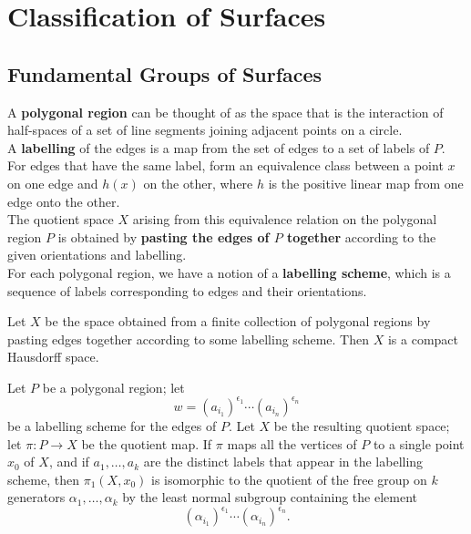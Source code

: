 \newpage

\section{Classification of Surfaces}

\setcounter{subsection}{73}
\subsection{Fundamental Groups of Surfaces}

\begin{definition}
A \textbf{polygonal region} can be thought of as the space that is the interaction of half-spaces of a set of line segments joining adjacent points on a circle. \\
    
A \textbf{labelling} of the edges is a map from the set of edges to a set of labels of $P$. For edges that have the same label, form an equivalence class between a point $x$ on one edge and $h(x)$ on the other, where $h$ is the positive linear map from one edge onto the other. \\
    
The quotient space $X$ arising from this equivalence relation on the polygonal region $P$ is obtained by \textbf{pasting the edges of $P$ together} according to the given orientations and labelling. \\

For each polygonal region, we have a notion of a \textbf{labelling scheme}, which is a sequence of labels corresponding to edges and their orientations.
\end{definition}

\begin{theorem}
Let $X$ be the space obtained from a finite collection of polygonal regions by pasting edges together according to some labelling scheme. Then $X$ is a compact Hausdorff space.
\end{theorem}

\begin{theorem}
    Let $P$ be a polygonal region; let 
    \[ 
        w = (a_{i_1})^{\epsilon_1} \cdots (a_{i_n})^{\epsilon_n}
    \]
    be a labelling scheme for the edges of $P$. Let $X$ be the resulting quotient space; let $\pi \colon P \rightarrow X$ be the quotient map. If $\pi$ maps all the vertices of $P$ to a single point $x_0$ of $X$, and if $a_1, \dots, a_k$ are the distinct labels that appear in the labelling scheme, then $\pi_1(X, x_0)$ is isomorphic to the quotient of the free group on $k$ generators $\alpha_1, \dots, \alpha_k$ by the least normal subgroup containing the element 
    \[
        (\alpha_{i_1})^{\epsilon_1} \cdots (\alpha_{i_n})^{\epsilon_n}.
    \]
\end{theorem}

